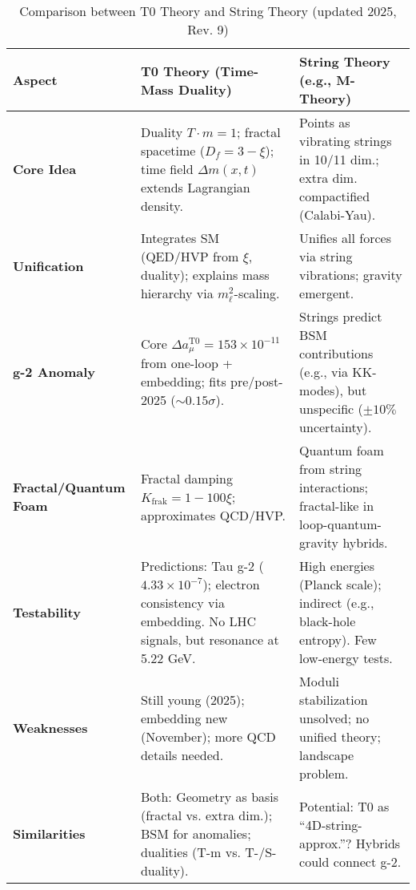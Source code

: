 \documentclass[12pt,a4paper]{article}
\theoremstyle{definition}
\begin{document}
	\begin{table}[ht]
		\centering
		\begin{adjustbox}{max width=\textwidth}
			\begin{tabular}{|p{3.5cm}|p{4.5cm}|p{4.5cm}|}
				\hline
				\textbf{Aspect} & \textbf{T0 Theory (Time-Mass Duality)} & \textbf{String Theory (e.g., M-Theory)} \\
				\hline
				\textbf{Core Idea} & Duality $T \cdot m = 1$; fractal spacetime ($D_f = 3 - \xi$); time field $\Delta m(x,t)$ extends Lagrangian density. & Points as vibrating strings in 10/11 dim.; extra dim. compactified (Calabi-Yau). \\
				\hline
				\textbf{Unification} & Integrates SM (QED/HVP from $\xi$, duality); explains mass hierarchy via $m_\ell^2$-scaling. & Unifies all forces via string vibrations; gravity emergent. \\
				\hline
				\textbf{g-2 Anomaly} & Core $\Delta a_\mu^{\text{T0}} = 153 \times 10^{-11}$ from one-loop + embedding; fits pre/post-2025 ($\sim 0.15 \sigma$). & Strings predict BSM contributions (e.g., via KK-modes), but unspecific ($\pm 10\%$ uncertainty). \\
				\hline
				\textbf{Fractal/Quantum Foam} & Fractal damping $K_{\text{frak}} = 1 - 100\xi$; approximates QCD/HVP. & Quantum foam from string interactions; fractal-like in loop-quantum-gravity hybrids. \\
				\hline
				\textbf{Testability} & Predictions: Tau g-2 ($4.33 \times 10^{-7}$); electron consistency via embedding. No LHC signals, but resonance at 5.22 GeV. & High energies (Planck scale); indirect (e.g., black-hole entropy). Few low-energy tests. \\
				\hline
				\textbf{Weaknesses} & Still young (2025); embedding new (November); more QCD details needed. & Moduli stabilization unsolved; no unified theory; landscape problem. \\
				\hline
				\textbf{Similarities} & Both: Geometry as basis (fractal vs. extra dim.); BSM for anomalies; dualities (T-m vs. T-/S-duality). & Potential: T0 as ``4D-string-approx.''? Hybrids could connect g-2. \\
				\hline
			\end{tabular}
		\end{adjustbox}
		\caption{Comparison between T0 Theory and String Theory (updated 2025, Rev. 9)}
		\label{tab:string_comparison}
	\end{table}
	
\end{document}
